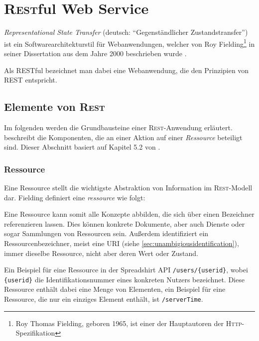 \section{\textsc{Rest}ful Web Service}
\label{sec:rest}

\emph{Representational State Transfer} (deutsch: \enquote{Gegenständlicher Zustandstransfer}) ist ein Softwarearchitekturstil für Webanwendungen, welcher von Roy Fielding\footnote{Roy Thomas Fielding, geboren 1965, ist einer der Hauptautoren der \textsc{Http}-Spezifikation} in seiner Dissertation aus dem Jahre 2000  beschrieben wurde \cite[Kapitel 5][95 ff.]{fieldingDissertation}. 

Als \gls{RESTful} bezeichnet man dabei eine Webanwendung, die den Prinzipien von \gls{REST} entspricht. 

\subsection{Elemente von \textsc{Rest}}

Im folgenden werden die Grundbausteine einer \textsc{Rest}-Anwendung erläutert.  beschreibt die Komponenten, die an einer Aktion auf einer \emph{Ressource} beteiligt sind. Dieser Abschnitt basiert auf Kapitel 5.2 von \cite[][S. 86 ff.]{fieldingDissertation}.

\subsubsection{Ressource}

Eine Ressource stellt die wichtigste Abstraktion von Information im \textsc{Rest}-Modell dar. Fielding definiert eine \emph{ressource} wie folgt:


Eine Ressource kann somit alle Konzepte abbilden, die sich über einen Bezeichner referenzieren lassen. Dies können konkrete Dokumente, aber auch Dienste oder sogar Sammlungen von Ressourcen sein.
Außerdem identifiziert ein Ressourcenbezeichner, meist eine \gls{URI} (siehe \cref{sec:unambigiousidentification}), immer dieselbe Ressource, nicht aber deren Wert oder Zustand.

Ein Beispiel für eine Ressource in der Spreadshirt \gls{API} \texttt{/users/\{userid\}}, wobei \texttt{\{userid\}} die Identifikationsnummer eines konkreten Nutzers bezeichnet. Diese Ressource enthält dabei eine Menge von Elementen, ein Beispiel für eine Ressource, die nur ein einziges Element enthält, ist \texttt{/serverTime}. 

